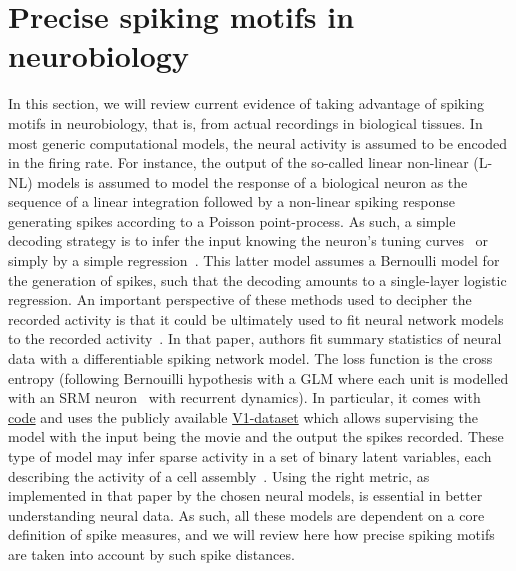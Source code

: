 \documentclass[brainsci, %
               review,submit,pdftex,moreauthors
               ]{Definitions/mdpi}
\begin{document}
\section{Precise spiking motifs in neurobiology}
In this section, we will review current evidence of taking advantage of spiking motifs in neurobiology, that is, from actual recordings in biological tissues. In most generic computational models, the neural activity is assumed to be encoded in the firing rate. For instance, the output of the so-called linear non-linear (L-NL) models is assumed to model the response of a biological neuron as the sequence of a linear integration followed by a non-linear spiking response generating spikes according to a Poisson point-process. As such, a simple decoding strategy is to infer the input knowing the neuron's tuning curves~\citep{jazayeri_optimal_2006} or simply by a simple regression~\citep{berens_fast_2012}. This latter model assumes a Bernoulli model for the generation of spikes, such that the decoding amounts to a single-layer logistic regression. An important perspective of these methods used to decipher the recorded activity is that it could be ultimately used to fit neural network models to the recorded activity~\citep{bellec_fitting_2021}. In that paper, authors fit summary statistics of neural data with a differentiable spiking network model. The loss function is the cross entropy (following Bernouilli hypothesis with a GLM where each unit is modelled with an SRM neuron~\citep{gerstner_time_1995} with recurrent dynamics). In particular, it comes with \href{https://github.com/EPFL-LCN/pub-bellec-wang-2021-sample-and-measure}{code} and uses the publicly available \href{http://crcns.org/data-sets/vc/pvc-11}{V1-dataset} which allows supervising the model with the input being the movie and the output the spikes recorded. These type of model may infer sparse activity in a set of binary latent variables, each describing the activity of a cell assembly~\citep{warner_probabilistic_2022}.
Using the right metric, as implemented in that paper by the chosen neural models, is essential in better understanding neural data. As such, all these models are dependent on a core definition of spike measures, and we will review here how precise spiking motifs are taken into account by such spike distances.
%
\end{document}
